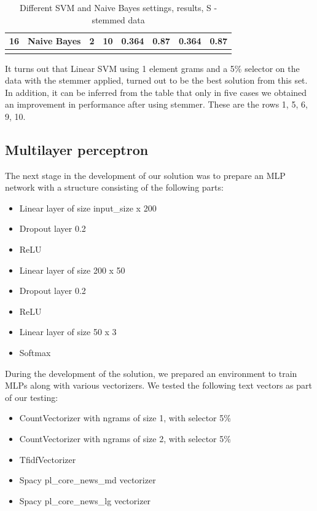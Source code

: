 \documentclass[a4paper]{article}
\begin{document}
\begin{table}[h]
\begin{tabular}{llllllll}
\multicolumn{1}{|l|}{16}  & \multicolumn{1}{l|}{Naive Bayes} & \multicolumn{1}{l|}{2}     & \multicolumn{1}{l|}{10}                   & \multicolumn{1}{l|}{0.364}        & \multicolumn{1}{l|}{0.87}         & \multicolumn{1}{l|}{0.364}    & \multicolumn{1}{l|}{0.87}     \\ \hline
                          &                                  &                            &                                           &                                   &                                   &                               &                              
\end{tabular}
\caption{Different SVM and Naive Bayes settings, results, S - stemmed data}
\label{tab:simple_results}
\end{table}

It turns out that Linear SVM using 1 element grams and a 5\% selector on the data with the stemmer applied, turned out to be the best solution from this set. In addition, it can be inferred from the table that only in five cases we obtained an improvement in performance after using stemmer. These are the rows 1, 5, 6, 9, 10.


\subsection{Multilayer perceptron}

The next stage in the development of our solution was to prepare an MLP network with a structure consisting of the following parts:

\begin{itemize}
    \item Linear layer of size input\_size x 200
    \item Dropout layer 0.2
    \item ReLU
    \item Linear layer of size 200 x 50
    \item Dropout layer 0.2
    \item ReLU
    \item Linear layer of size 50 x 3
    \item Softmax
\end{itemize}


During the development of the solution, we prepared an environment to train MLPs along with various vectorizers. We tested the following text vectors as part of our testing:


\begin{itemize}
    \item CountVectorizer with ngrams of size 1, with selector 5\%
    \item CountVectorizer with ngrams of size 2, with selector 5\%
    \item TfidfVectorizer
    \item Spacy pl\_core\_news\_md vectorizer
    \item Spacy pl\_core\_news\_lg vectorizer
\end{itemize}
\end{document}
